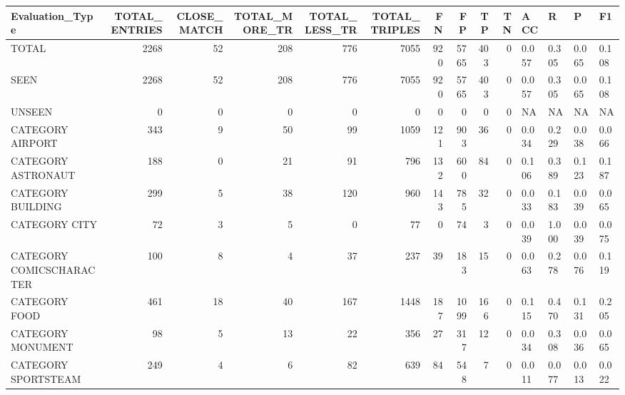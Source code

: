\begin{tabular}{lrrrrrrrrrllll}
\hline
 Evaluation\_Type          &   TOTAL\_ENTRIES &   CLOSE\_MATCH &   TOTAL\_MORE\_TR &   TOTAL\_LESS\_TR &   TOTAL\_TRIPLES &   FN &   FP &   TP &   TN & ACC   & R     & P     & F1    \\
\hline
 TOTAL                    &            2268 &            52 &             208 &             776 &            7055 &  920 & 5765 &  403 &    0 & 0.057 & 0.305 & 0.065 & 0.108 \\
 SEEN                     &            2268 &            52 &             208 &             776 &            7055 &  920 & 5765 &  403 &    0 & 0.057 & 0.305 & 0.065 & 0.108 \\
 UNSEEN                   &               0 &             0 &               0 &               0 &               0 &    0 &    0 &    0 &    0 & NA    & NA    & NA    & NA    \\
 CATEGORY AIRPORT         &             343 &             9 &              50 &              99 &            1059 &  121 &  903 &   36 &    0 & 0.034 & 0.229 & 0.038 & 0.066 \\
 CATEGORY ASTRONAUT       &             188 &             0 &              21 &              91 &             796 &  132 &  600 &   84 &    0 & 0.106 & 0.389 & 0.123 & 0.187 \\
 CATEGORY BUILDING        &             299 &             5 &              38 &             120 &             960 &  143 &  785 &   32 &    0 & 0.033 & 0.183 & 0.039 & 0.065 \\
 CATEGORY CITY            &              72 &             3 &               5 &               0 &              77 &    0 &   74 &    3 &    0 & 0.039 & 1.000 & 0.039 & 0.075 \\
 CATEGORY COMICSCHARACTER &             100 &             8 &               4 &              37 &             237 &   39 &  183 &   15 &    0 & 0.063 & 0.278 & 0.076 & 0.119 \\
 CATEGORY FOOD            &             461 &            18 &              40 &             167 &            1448 &  187 & 1099 &  166 &    0 & 0.115 & 0.470 & 0.131 & 0.205 \\
 CATEGORY MONUMENT        &              98 &             5 &              13 &              22 &             356 &   27 &  317 &   12 &    0 & 0.034 & 0.308 & 0.036 & 0.065 \\
 CATEGORY SPORTSTEAM      &             249 &             4 &               6 &              82 &             639 &   84 &  548 &    7 &    0 & 0.011 & 0.077 & 0.013 & 0.022 \\

\end{tabular}
